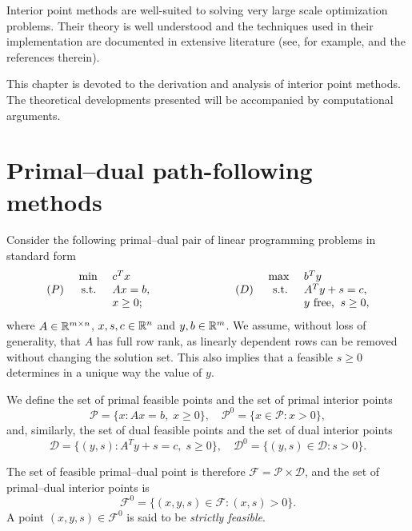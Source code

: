 
%
%
\label{ch:Ipm}

Interior point methods are well-suited to solving very
large scale optimization problems. Their theory is well understood
\cite{ipm:Wright97} and the techniques used in their implementation are
documented in extensive literature (see, for example, 
\cite{AndersenGondzioMeszarosXu,GondzioTerlaky} and the references therein).

This chapter is devoted to the derivation and analysis of interior 
point methods. 
The theoretical developments presented will be accompanied by computational 
arguments.


%
%
\section{Primal--dual path-following methods}
\label{sec:Derivation}

Consider the following primal--dual pair of linear programming problems 
in standard form
%
\begin{eqnarray} \label{eq:PrimalDualPair}
  \begin{array}{crlp{2cm}crl}
     & \mbox{ min } & c^T x     &  &     & \mbox{ max }  & b^T y \\
 (P) &\mbox{ s.t. } & Ax = b,   &  & (D) & \mbox{ s.t. } & A^T y + s = c, \\
     &              & x \geq 0; &  &     &   & y \mbox{ free,} \;\; s \geq 0,
  \end{array}
\end{eqnarray}
%
where $A \in \mathbb{R}^{m \times n}$, $x, s, c \in \mathbb{R}^{n}$ 
and $y, b \in \mathbb{R}^{m}$. We assume, without loss of generality,
that $A$ has full row rank, as linearly dependent rows can be
removed without changing the solution set.
This also implies that a feasible $s \ge 0$ determines in a unique
way the value of $y$.

We define the set of primal feasible points and the set of
primal interior points 
\[
\mathcal{P} = \{ x : Ax = b, \; x \ge 0 \}, \quad
\mathcal{P}^0 = \{ x \in \mathcal{P} : x > 0 \},
\]
and, similarly, the set of dual feasible points and the set of
dual interior points
\[
\mathcal{D} = \{ (y,s) : A^T y + s = c, \; s \ge 0 \}, \quad
\mathcal{D}^0 = \{ (y,s) \in \mathcal{D} : s > 0 \}.
\]

The set of feasible primal--dual point is therefore
$\mathcal{F} = \mathcal{P} \times \mathcal{D}$, and the set of primal--dual
interior points is
\[
\mathcal{F}^0 = \{ (x,y,s) \in \mathcal{F} : (x,s) > 0 \}.
\]
A point $(x,y,s) \in \mathcal{F}^0$ is said to be {\em strictly feasible}.


